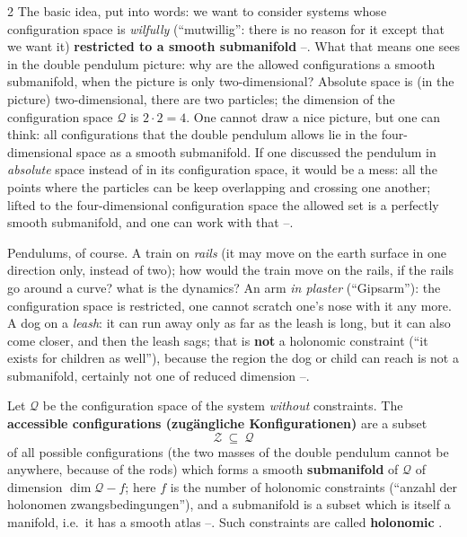 \begin{paracol}{2}
The basic idea, put into words: we want to consider systems whose configuration space is \emph{wilfully} (``mutwillig'': there is no reason for it except that we want it) \textbf{restricted to a smooth submanifold} --. What that means one sees in the double pendulum picture: why are the allowed configurations a smooth submanifold, when the picture is only two-dimensional? Absolute space is (in the picture) two-dimensional, there are two particles; the dimension of the configuration space $\mathcal Q$ is $2\cdot2=4$. One cannot draw a nice picture, but one can think: all configurations that the double pendulum allows lie in the four-dimensional space as a smooth submanifold. If one discussed the pendulum in \emph{absolute} space instead of in its configuration space, it would be a mess: all the points where the particles can be keep overlapping and crossing one another; lifted to the four-dimensional configuration space the allowed set is a perfectly smooth submanifold, and one can work with that --.

\begin{example}\label{ex:zw-examples}
Pendulums, of course. A train on \emph{rails} (it may move on the earth surface in one direction only, instead of two); how would the train move on the rails, if the rails go around a curve? what is the dynamics? An arm \emph{in plaster} (``Gipsarm''): the configuration space is restricted, one cannot scratch one's nose with it any more. A dog on a \emph{leash}: it can run away only as far as the leash is long, but it can also come closer, and then the leash sags; that is \textbf{not} a holonomic constraint (``it exists for children as well''), because the region the dog or child can reach is not a submanifold, certainly not one of reduced dimension --.
\end{example}

\begin{definition}\label{def:zw-access}
Let $\mathcal Q$ be the configuration space of the system \emph{without} constraints. The \textbf{accessible configurations (zug\"angliche Konfigurationen)} are a subset
\[
  \mathcal Z\ \subseteq\ \mathcal Q
\]
of all possible configurations (the two masses of the double pendulum cannot be anywhere, because of the rods) which forms a smooth \textbf{submanifold} of $\mathcal Q$ of dimension $\dim\mathcal Q-f$; here $f$ is the number of holonomic constraints (``anzahl der holonomen zwangsbedingungen''), and a submanifold is a subset which is itself a manifold, i.e.\ it has a smooth atlas --. Such constraints are called \textbf{holonomic} .
\end{definition}


\end{paracol}
